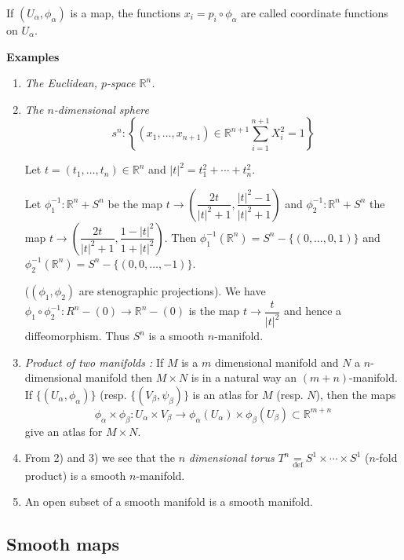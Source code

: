 If $(U_{\alpha},\phi_{\alpha})$ is a map, the functions $x_{i}=p_{i}\circ \phi_{\alpha}$ are called coordinate functions on $U_{\alpha}$.

\medskip
\noindent
{\bf Examples}
\begin{enumerate}
\item {\em The Euclidean, $p$-space $\mathbb{R}^{n}$.}

\item {\em The $n$-dimensional sphere}
$$
s^{n}:\left\{(x_{1},\ldots,x_{n+1})\in \mathbb{R}^{n+1}\sum\limits^{n+1}_{i=1}X^{2}_{i}=1\right\}
$$

Let $t=(t_{1},\ldots,t_{n})\in \mathbb{R}^{n}$ and $|t|^{2}=t^{2}_{1}+\cdots+t^{2}_{n}$.

Let $\phi^{-1}_{1}:\mathbb{R}^{n}+S^{n}$ be the map $t\to \left(\dfrac{2t}{|t|^{2}+1},\dfrac{|t|^{2}-1}{|t|^{2}+1}\right)$ and $\phi^{-1}_{2}:\mathbb{R}^{n}+S^{n}$ the map $t\to \left(\dfrac{2t}{|t|^{2}+1},\dfrac{1-|t|^{2}}{1+|t|^{2}}\right)$. Then $\phi^{-1}_{1}(\mathbb{R}^{n})=S^{n}-\{(0,\ldots,0,1)\}$ and $\phi^{-1}_{2}(\mathbb{R}^{n})=S^{n}-\{(0,0,\ldots,-1)\}$.

($(\phi_{1},\phi_{2})$ are stenographic projections). We have $\phi_{1}\circ \phi^{-1}_{2}:R^{n}-(0)\to \mathbb{R}^{n}-(0)$ is the map $t\to \dfrac{t}{|t|^{2}}$ and hence a diffeomorphism. Thus $S^{n}$ is a smooth $n$-manifold.

\item {\em Product of two manifolds :} If $M$ is a $m$ dimensional manifold and $N$ a $n$-dimensional manifold then $M\times N$ is in a natural way an $(m+n)$-manifold. If $\{(U_{\alpha},\phi_{\alpha})\}$ (resp. $\{(V_{\beta},\psi_{\beta})\}$ is an atlas for $M$ (resp. $N$), then the maps
$$
\phi_{\alpha}\times \phi_{\beta}:U_{\alpha}\times V_{\beta}\to \phi_{\alpha}(U_{\alpha})\times \phi_{\beta}(U_{\beta})\subset \mathbb{R}^{m+n}
$$\pageoriginale
give an atlas for $M\times N$.

\item From 2) and 3) we see that the $n$ {\em dimensional torus} $T^{n}{\displaystyle{\mathop{=}\limits_{\text{def}}}}S^{1}\times \cdots \times S^{1}$ ($n$-fold product) is a smooth $n$-manifold.

\item An open subset of a smooth manifold is a smooth manifold.
\end{enumerate}

\subsection*{Smooth maps}


